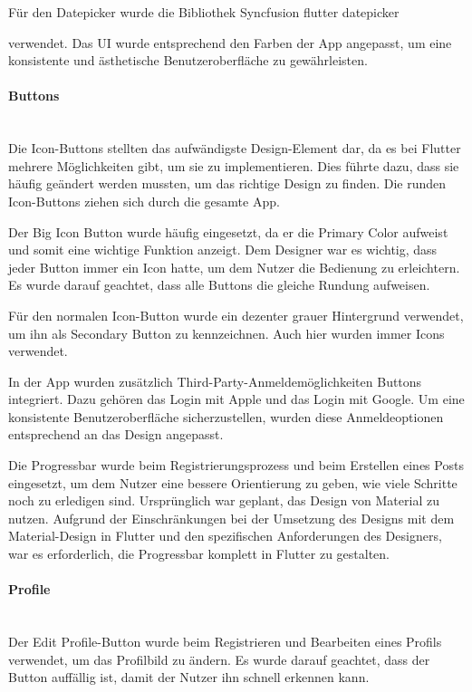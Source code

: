 Für den Datepicker wurde die Bibliothek
Syncfusion flutter datepicker

\cite{syncfusion_flutter_datepicker} verwendet. Das UI wurde
entsprechend den Farben der App angepasst, um eine
konsistente und ästhetische Benutzeroberfläche zu
gewährleisten.

\paragraph{Buttons}\mbox{} \\
Die Icon-Buttons stellten das aufwändigste Design-Element
dar, da es bei Flutter mehrere Möglichkeiten gibt, um sie zu
implementieren. Dies führte dazu, dass sie häufig geändert
werden mussten, um das richtige Design zu finden. Die
runden Icon-Buttons ziehen sich durch die gesamte App.

Der Big Icon Button wurde häufig eingesetzt, da er die Primary Color aufweist und somit eine wichtige Funktion anzeigt. Dem Designer war es wichtig, dass jeder Button immer ein Icon hatte, um dem Nutzer die Bedienung zu erleichtern. Es wurde darauf geachtet, dass alle Buttons die gleiche Rundung aufweisen.

Für den normalen Icon-Button wurde ein dezenter grauer Hintergrund verwendet, um ihn als Secondary Button zu kennzeichnen. Auch hier wurden immer Icons verwendet.

In der App wurden zusätzlich Third-Party-Anmeldemöglichkeiten Buttons integriert. Dazu gehören das Login mit Apple und das Login mit Google. Um eine konsistente Benutzeroberfläche sicherzustellen, wurden diese Anmeldeoptionen entsprechend an das Design angepasst.

Die Progressbar wurde beim Registrierungsprozess und beim
Erstellen eines Posts eingesetzt, um dem Nutzer eine bessere
Orientierung zu geben, wie viele Schritte noch zu erledigen
sind. Ursprünglich war geplant, das Design von Material zu
nutzen. Aufgrund der Einschränkungen bei der Umsetzung des
Designs mit dem Material-Design in Flutter und den spezifischen
Anforderungen des Designers, war es erforderlich, die
Progressbar komplett in Flutter zu gestalten.

\paragraph{Profile}\mbox{} \\
Der Edit Profile-Button wurde beim Registrieren und
Bearbeiten eines Profils verwendet, um das Profilbild
zu ändern. Es wurde darauf geachtet, dass der Button
auffällig ist, damit der Nutzer ihn schnell erkennen kann.

